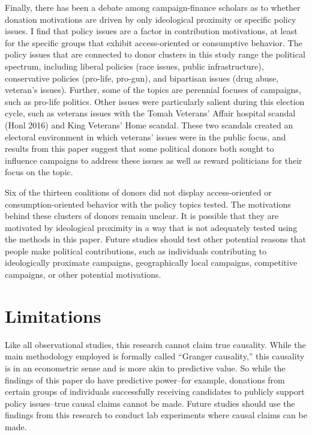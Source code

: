 \documentclass[12pt,]{article}
\begin{document}
Finally, there has been a debate among campaign-finance scholars as to
whether donation motivations are driven by only ideological proximity or
specific policy issues. I find that policy issues are a factor in
contribution motivations, at least for the specific groups that exhibit
access-oriented or consumptive behavior. The policy issues that are
connected to donor clusters in this study range the political spectrum,
including liberal policies (race issues, public infrastructure),
conservative policies (pro-life, pro-gun), and bipartisan issues (drug
abuse, veteran's issues). Further, some of the topics are perennial
focuses of campaigns, such as pro-life politics. Other issues were
particularly salient during this election cycle, such as veterans issues
with the Tomah Veterans' Affair hospital scandal (Honl 2016) and King
Veterans' Home scandal. These two scandals created an electoral
environment in which veterans' issues were in the public focus, and
results from this paper suggest that some political donors both sought
to influence campaigns to address these issues as well as reward
politicians for their focus on the topic.

Six of the thirteen coalitions of donors did not display access-oriented
or consumption-oriented behavior with the policy topics tested. The
motivations behind these clusters of donors remain unclear. It is
possible that they are motivated by ideological proximity in a way that
is not adequately tested using the methods in this paper. Future studies
should test other potential reasons that people make political
contributions, such as individuals contributing to ideologically
proximate campaigns, geographically local campaigns, competitive
campaigns, or other potential motivations.

\hypertarget{limitations}{%
\section{Limitations}\label{limitations}}

Like all observational studies, this research cannot claim true
causality. While the main methodology employed is formally called
``Granger causality,'' this causality is in an econometric sense and is
more akin to predictive value. So while the findings of this paper do
have predictive power--for example, donations from certain groups of
individuals successfully receiving candidates to publicly support policy
issues--true causal claims cannot be made. Future studies should use the
findings from this research to conduct lab experiments where causal
claims can be made.
\end{document}
